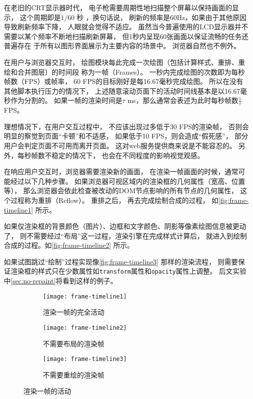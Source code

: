 在老旧的CRT显示器时代，
电子枪需要周期性地扫描整个屏幕以保持画面的显示，
这个周期即是$1/60$ 秒 ，换句话说，
刷新的频率是60Hz，如果由于其他原因导致刷新频率下降，
人眼就会觉得不适应。
虽然当今普遍使用的LCD显示器并不需要以某个频率不断地扫描刷新屏幕，
但1秒内呈现60张画面以保证流畅的任务还普遍存在
于所有以图形界面展示为主要内容的场景中。
浏览器自然也不例外。

在用户与浏览器交互时，
绘图模块每此完成一次绘图（包括计算样式、重排、重绘和合并图层）的时间段
称为一帧（Frames）。
一秒内完成绘图的次数即为每秒帧数（FPS）或帧率，
60 FPS的目标刚好是每16.67毫秒完成绘图。
所以在没有其他脚本执行压力的情况下，
上述随意滚动页面下的活动时间线基本是以16.67毫秒作为分割的。
如果一帧的渲染时间是$\tau$ ms，那么通常会表述为此时每秒帧数$\frac{1}{\tau}$ FPS。

理想情况下，在用户交互过程中，
不应该出现过多低于30 FPS的渲染帧，
否则会明显的察觉到页面``卡顿''和不适感\cite{gandy2010experiences}，
如果低于10 FPS，则会造成``假死感''，
部分用户会判定页面不可用而离开页面。
这对web服务提供商来说是不能容忍的。
另外，每秒帧数不稳定的情况下，
也会在不同程度的影响视觉观感。

在响应用户交互时，浏览器需要渲染新的画面，
在渲染一帧画面的时候，通常可能经过以下几种步骤。
如果浏览器可视区域内的渲染框的几何属性（宽高、位置等），
那么浏览器会依此检查被改动的DOM节点影响的所有节点的几何属性，
这个过程称为重排（Reflow）。
重排之后，
再去完成绘制合成的过程，
如\autoref{fig:frame-timeline1} 所示。

如果仅渲染框的背景颜色（图片）、边框和文字颜色、阴影等像素绘图信息被更动了，
则不需要经过``布局''这一过程，渲染引擎在完成样式计算后，
就进入到绘制合成的过程。如\autoref{fig:frame-timeline2} 所示。

如果试图跳过``绘制''过程实现像\autoref{fig:frame-timeline3} 那样的渲染流程，
则需要保证渲染框的样式只在少数属性如\texttt{transform}属性和\texttt{opacity}属性上调整。
后文实验中\ref{sec:no-repaint}将看到这样的例子。

\begin{figure}[htbp]
	\centering
	\begin{subfigure}[b]{\textwidth}
		\centering
		\texttt{[image: frame-timeline1]}
		\caption{渲染一帧的完全活动}\label{fig:frame-timeline1}
	\end{subfigure}
	\quad
	\begin{subfigure}[b]{\textwidth}
		\centering
		\texttt{[image: frame-timeline2]}
        \caption{不需要布局的渲染帧}\label{fig:frame-timeline2}
	\end{subfigure}
    \begin{subfigure}[b]{\textwidth}
		\centering
		\texttt{[image: frame-timeline3]}
        \caption{不需要重绘的渲染帧}\label{fig:frame-timeline3}
	\end{subfigure}
	\caption{渲染一帧的活动}\label{fig:frame-timeline}
\end{figure}

